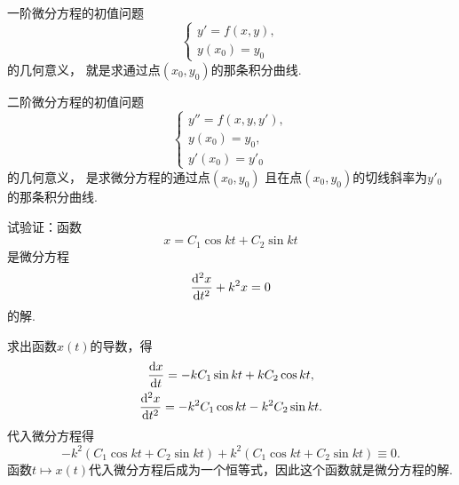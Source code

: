 一阶微分方程的初值问题\[
	\left\{ \begin{array}{l}
		y' = f(x,y), \\
		y(x_0) = y_0
	\end{array} \right.
\]的几何意义，
就是求通过点\((x_0,y_0)\)的那条积分曲线.

二阶微分方程的初值问题\[
	\left\{ \begin{array}{l}
		y'' = f(x,y,y'), \\
		y(x_0) = y_0, \\
		y'(x_0) = y'_0
	\end{array} \right.
\]的几何意义，
是求微分方程的通过点\((x_0,y_0)\)
且在点\((x_0,y_0)\)的切线斜率为\(y'_0\)的那条积分曲线.

\begin{example}
试验证：函数\[
	x = C_1 \cos kt + C_2 \sin kt
\]是微分方程\[
	\dv[2]{x}{t} + k^2 x = 0
\]的解.
\begin{solution}
求出函数\(x(t)\)的导数，得\begin{gather*}
	\dv{x}{t} = -k C_1 \sin kt + k C_2 \cos kt, \\
	\dv[2]{x}{t} = -k^2 C_1 \cos kt - k^2 C_2 \sin kt.
\end{gather*}
代入微分方程得\[
	-k^2 (C_1 \cos kt + C_2 \sin kt) + k^2 (C_1 \cos kt + C_2 \sin kt)
	\equiv 0.
\]
函数\(t \mapsto x(t)\)代入微分方程后成为一个恒等式，因此这个函数就是微分方程的解.
\end{solution}
\end{example}
